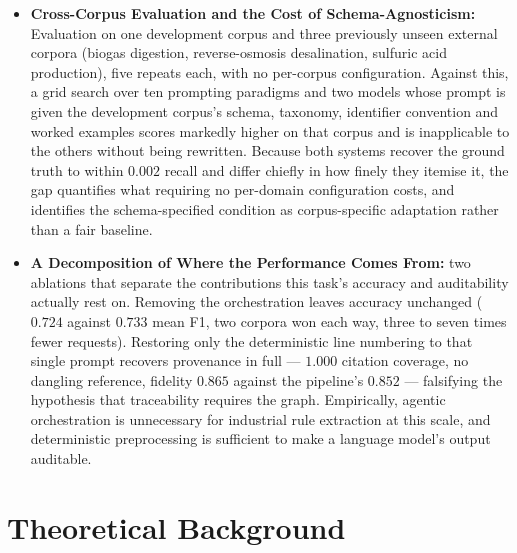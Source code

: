 \documentclass[11pt]{article}
\begin{document}
\begin{itemize}
          corpora, so it cannot have been chosen to flatter the system. The same
          study reports, with equal prominence, what the metric does \emph{not}
          measure: word order within a record, which value is bound to which
          record, which slot a value occupies inside a record, and the
          correctness of the discovered category label.
    \item \textbf{Cross-Corpus Evaluation and the Cost of Schema-Agnosticism:}
          Evaluation on one development corpus and three previously unseen
          external corpora (biogas digestion, reverse-osmosis desalination,
          sulfuric acid production), five repeats each, with no per-corpus
          configuration. Against this, a grid search over ten prompting paradigms
          and two models whose prompt is given the development corpus's schema,
          taxonomy, identifier convention and worked examples scores markedly
          higher on that corpus and is inapplicable to the others without being
          rewritten. Because both systems recover the ground truth to within
          $0.002$ recall and differ chiefly in how finely they itemise it, the
          gap quantifies what requiring no per-domain configuration costs, and
          identifies the schema-specified condition as corpus-specific adaptation
          rather than a fair baseline.
    \item \textbf{A Decomposition of Where the Performance Comes From:} two
          ablations that separate the contributions this task's accuracy and
          auditability actually rest on. Removing the orchestration leaves
          accuracy unchanged ($0.724$ against $0.733$ mean F1, two corpora won
          each way, three to seven times fewer requests). Restoring only the
          deterministic line numbering to that single prompt recovers provenance
          in full --- $1.000$ citation coverage, no dangling reference, fidelity
          $0.865$ against the pipeline's $0.852$ --- falsifying the hypothesis
          that traceability requires the graph. Empirically, agentic
          orchestration is unnecessary for industrial rule extraction at this
          scale, and deterministic preprocessing is sufficient to make a
          language model's output auditable.
\end{itemize}

\section{Theoretical Background}
\label{sec:background}
\end{document}
